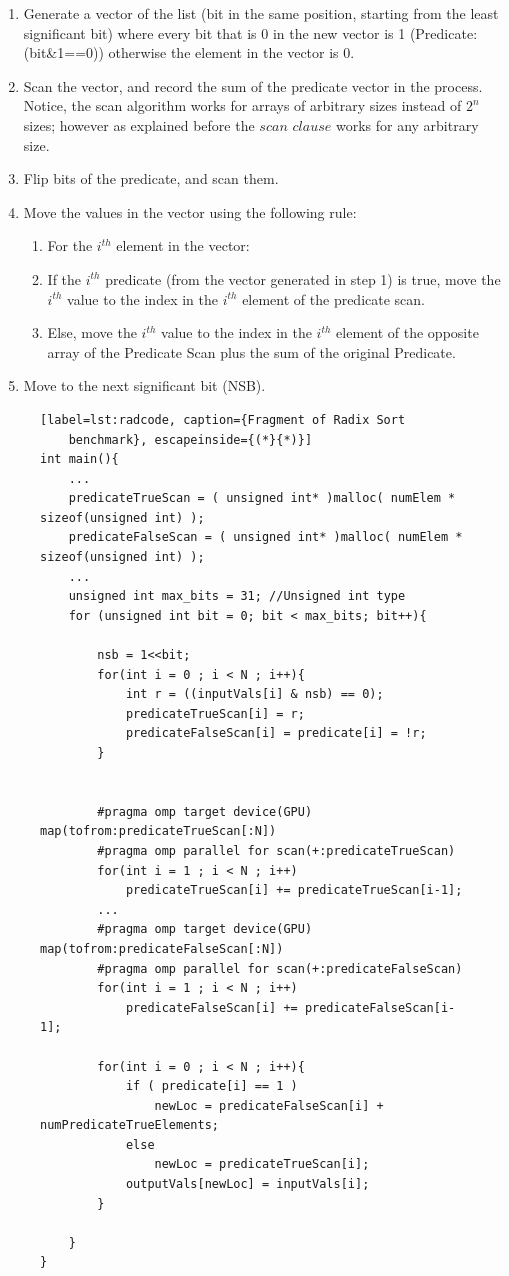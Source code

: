 \documentclass[Ingles]{ic-tese-v1}
\begin{document}
\begin{enumerate}
\item Generate a vector of the list (bit in the same position, starting from the least significant bit)
where every bit that is 0 in the new vector is 1 (Predicate: (bit\&1==0)) otherwise the element in the vector  is 0.
\item Scan the vector, and record the sum of the predicate vector in the process. Notice, the scan
algorithm works for arrays of arbitrary sizes instead of $2^{n}$ sizes; however as
explained before the $scan$ $clause$ works  for any arbitrary size.
\item Flip bits of the predicate, and scan them.
\item Move the values in the vector using the following rule:
\begin{enumerate}
\item For the $i^{th}$ element in the vector:
\item If the $i^{th}$ predicate (from the vector generated in step 1) is true, move the $i^{th}$
value to the index in the $i^{th}$ element of the predicate scan.
\item Else, move the $i^{th}$ value to the index in the $i^{th}$ element of the opposite array
of the Predicate Scan plus the sum of the original Predicate.
\end{enumerate}
\item Move to the next significant bit (NSB).
\end{enumerate}


\begin{figure}[t]
	\lstset{basicstyle=\scriptsize}
	\begin{lstlisting}[label=lst:radcode, caption={Fragment of Radix Sort
	benchmark}, escapeinside={(*}{*)}]
int main(){
	...
	predicateTrueScan = ( unsigned int* )malloc( numElem * sizeof(unsigned int) );
	predicateFalseScan = ( unsigned int* )malloc( numElem * sizeof(unsigned int) );
	...
	unsigned int max_bits = 31; //Unsigned int type
	for (unsigned int bit = 0; bit < max_bits; bit++){

		nsb = 1<<bit;
		for(int i = 0 ; i < N ; i++){
			int r = ((inputVals[i] & nsb) == 0);
			predicateTrueScan[i] = r;
			predicateFalseScan[i] = predicate[i] = !r;
		}


		#pragma omp target device(GPU) map(tofrom:predicateTrueScan[:N])
		#pragma omp parallel for scan(+:predicateTrueScan)
		for(int i = 1 ; i < N ; i++)
			predicateTrueScan[i] += predicateTrueScan[i-1];
		...
		#pragma omp target device(GPU) map(tofrom:predicateFalseScan[:N])
		#pragma omp parallel for scan(+:predicateFalseScan)
		for(int i = 1 ; i < N ; i++)
			predicateFalseScan[i] += predicateFalseScan[i-1];

		for(int i = 0 ; i < N ; i++){
			if ( predicate[i] == 1 )
				newLoc = predicateFalseScan[i] + numPredicateTrueElements;
			else
				newLoc = predicateTrueScan[i];
			outputVals[newLoc] = inputVals[i];
		}

	}
}
	\end{lstlisting}
\end{figure}
\end{document}
